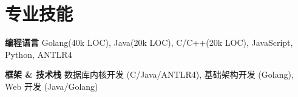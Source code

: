 \documentclass[letterpaper,10pt]{article}
\newcommand{\resumeItem}[2]{
  \item\small{
    \textbf{\:#1}{ #2 \vspace{-4pt}}
  }
}
\begin{document}
    
        
\section{专业技能}
  	\resumeItem
      {编程语言}
      {Golang(40k LOC), Java(20k LOC), C/C++(20k LOC), JavaScript, Python, ANTLR4}
    \resumeItem
      {框架 \& 技术栈}
      {数据库内核开发 (C/Java/ANTLR4), 基础架构开发 (Golang), Web 开发 (Java/Golang)}


\end{document}
